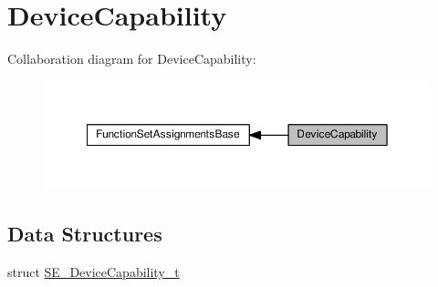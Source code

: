 \hypertarget{group__DeviceCapability}{}\section{Device\+Capability}
\label{group__DeviceCapability}
Collaboration diagram for Device\+Capability\+:\nopagebreak
\begin{figure}[H]
\begin{center}
\leavevmode
\includegraphics[width=350pt]{group__DeviceCapability}
\end{center}
\end{figure}
\subsection*{Data Structures}
\begin{DoxyCompactItemize}
\item 
struct \hyperlink{structSE__DeviceCapability__t}{S\+E\+\_\+\+Device\+Capability\+\_\+t}
\end{DoxyCompactItemize}

